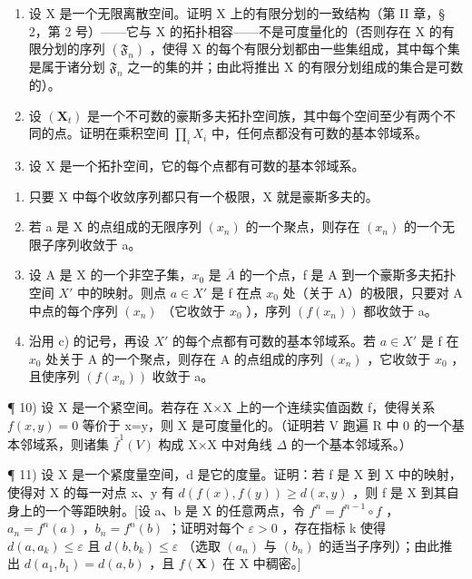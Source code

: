 \begin{enumerate}
\def\labelenumi{\arabic{enumi})}
\setcounter{enumi}{6}
\item
  设 X 是一个无限离散空间。证明 X 上的有限分划的一致结构（第 II 章，§ 2，第 2 号）——它与 X 的拓扑相容——不是可度量化的（否则存在 X 的有限分划的序列 \((\mathfrak{F}_n)\) ，使得 X 的每个有限分划都由一些集组成，其中每个集是属于诸分划 \(\mathfrak{F}_n\) 之一的集的并；由此将推出 X 的有限分划组成的集合是可数的）。
\item
  设 \((\mathbf{X}_{t})\) 是一个不可数的豪斯多夫拓扑空间族，其中每个空间至少有两个不同的点。证明在乘积空间 \(\prod_{i} X_{i}\) 中，任何点都没有可数的基本邻域系。
\item
  设 X 是一个拓扑空间，它的每个点都有可数的基本邻域系。
\end{enumerate}

\begin{enumerate}
\def\labelenumi{\alph{enumi})}
\item
  只要 X 中每个收敛序列都只有一个极限，X 就是豪斯多夫的。
\item
  若 a 是 X 的点组成的无限序列 \((x_{n})\) 的一个聚点，则存在 \((x_{n})\) 的一个无限子序列收敛于 a。
\item
  设 A 是 X 的一个非空子集，\(x_{0}\) 是 \(\overline{A}\) 的一个点，f 是 A 到一个豪斯多夫拓扑空间 \(X'\) 中的映射。则点 \(a \in X'\) 是 f 在点 \(x_{0}\) 处（关于 A）的极限，只要对 A 中点的每个序列 \((x_{n})\) （它收敛于 \(x_{0}\) ），序列 \((f(x_{n}))\) 都收敛于 a。
\item
  沿用 c) 的记号，再设 \(X'\) 的每个点都有可数的基本邻域系。若 \(a \in X'\) 是 f 在 \(x_{0}\) 处关于 A 的一个聚点，则存在 A 的点组成的序列 \((x_{n})\) ，它收敛于 \(x_{0}\) ，且使序列 \((f(x_{n}))\) 收敛于 a。
\end{enumerate}

¶ 10) 设 X 是一个紧空间。若存在 X×X 上的一个连续实值函数 f，使得关系 \(f(x,y)=0\) 等价于 x=y，则 X 是可度量化的。（证明若 V 跑遍 R 中 0 的一个基本邻域系，则诸集 \(\overline{f}^{1}(V)\) 构成 X×X 中对角线 \(\Delta\) 的一个基本邻域系。）

¶ 11) 设 X 是一个紧度量空间，d 是它的度量。证明：若 f 是 X 到 X 中的映射，使得对 X 的每一对点 x、y 有 \(d(f(x), f(y)) \geqslant d(x, y)\) ，则 f 是 X 到其自身上的一个等距映射。{[}设 a、b 是 X 的任意两点，令 \(f^n = f^{n-1} \circ f\) ，\(a_n = f^n(a)\) ，\(b_n = f^n(b)\) ；证明对每个 \(\varepsilon > 0\) ，存在指标 k 使得 \(d(a, a_k) \leqslant \varepsilon\) 且 \(d(b, b_k) \leqslant \varepsilon\) （选取 \((a_n)\) 与 \((b_n)\) 的适当子序列）；由此推出 \(d(a_1, b_1) = d(a, b)\) ，且 \(f(\mathbf{X})\) 在 X 中稠密。{]}

